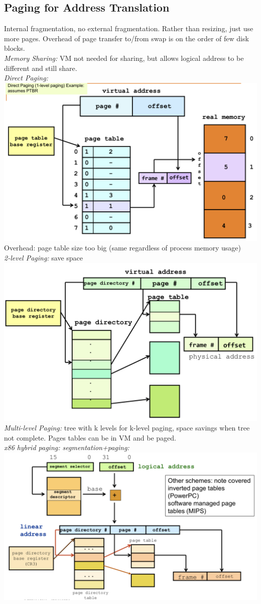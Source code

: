 \subsection*{Paging for Address Translation}
Internal fragmentation, no external fragmentation. Rather than resizing, just use more pages. Overhead of page transfer to/from swap is on the order of few disk blocks.\\
\emph{Memory Sharing:} VM not needed for sharing, but allows logical address to be different and still share.\\
\emph{Direct Paging:}\\
\includegraphics[width=0.8\linewidth]{images/direct-paging}\\
Overhead: page table size too big (same regardless of process memory usage)\\
\emph{2-level Paging:} save space\\
\includegraphics[width=0.8\linewidth]{images/2-level-paging}\\
\emph{Multi-level Paging:} tree with k levels for k-level paging, space savings when tree not complete. Pages tables can be in VM and be paged.\\
\emph{x86 hybrid paging: segmentation+paging:}\\
\includegraphics[width=0.8\linewidth]{images/x86-paging}

